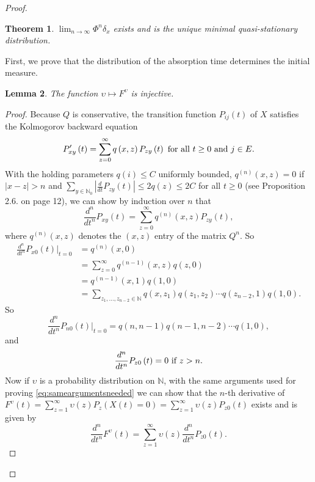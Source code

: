 \documentclass[12pt,a4paper]{scrartcl}
\newtheorem{theorem}{Theorem}[section]
\newtheorem{lemma}[theorem]{Lemma}
\numberwithin{equation}{section}
\newcommand{\N}{\mathbb{N}} %
\begin{document}
\begin{proof}
\begin{theorem} \label{th:birthanddeathmaintheorem}
$\lim_{n \to \infty} \Phi^n \delta_x$ exists and is the unique minimal quasi-stationary distribution.
\end{theorem}  

First, we prove that the distribution of the absorption time determines the initial measure.

\begin{lemma}
The function $\upsilon \mapsto F^{\upsilon}$ is injective.
\end{lemma}

\begin{proof}
Because $Q$ is conservative, the transition function $P_{ij}\left(t\right)$ of $X$ satisfies the Kolmogorov backward equation $$P_{xy}'\left(t\right) = \sum_{z = 0}^{\infty} q\left(x,z\right) P_{zy}\left(t\right) \textnormal{ for all } t\geq0 \textnormal{ and } j\in E. $$ 
With the holding parameters $q\left(i\right) \leq C$ uniformly bounded, $q^{\left(n\right)}\left(x,z\right) = 0$ if $\left|x - z\right| > n$ and $ \sum_{y \in \N_0} \left|\frac{d}{dt} P_{zy}\left(t\right) \right| \leq  2 q\left(z\right) \leq 2 C$ for all $t \geq 0$ (see \cite{anderson} Proposition 2.6. on page 12), we can show by induction over $n$ that
\begin{equation} \label{eq:sameargumentsneeded}
\frac{d^n}{dt^n} P_{xy}\left(t\right) = \sum_{z=0}^{\infty} q^{\left(n\right)}\left(x,z\right) P_{zy}\left(t\right),
\end{equation}
where $q^{\left(n\right)}\left(x,z\right)$ denotes the $\left(x,z\right)$ entry of the matrix $Q^n.$ So
\begin{align*}
\frac{d^n}{dt^n} P_{x0}\left(t\right) |_{t=0} &=q^{\left(n\right)}\left(x,0\right)\\
&= \sum_{z=0}^{\infty} q^{\left(n-1\right)}\left(x,z\right) q\left(z,0\right) \\
&= q^{\left(n-1\right)}\left(x,1\right) q\left(1,0\right)\\
&= \sum_{z_1,\ldots, z_{n-2} \in \N} q\left(x,z_1\right)q\left(z_1,z_2\right)\cdots q\left(z_{n-2},1\right) q\left(1,0\right).
\end{align*}
So
$$ \frac{d^n}{dt^n} P_{n0}\left(t\right) |_{t=0} = q\left(n,n-1\right) q\left(n-1,n-2\right) \cdots q\left(1,0\right), $$
and
$$\frac{d^n}{dt^n} P_{z0}\left(t\right) = 0 \textnormal{ if } z > n.$$
Now if $\upsilon$ is a probability distribution on $\N$, with the same arguments used for proving \eqref{eq:sameargumentsneeded} we can show that the $n$-th derivative of $F^{\upsilon}\left(t\right) = \sum_{z=1}^{\infty} \upsilon\left(z\right) P_z\left(X\left(t\right) = 0 \right) = \sum_{z=1}^{\infty} \upsilon\left(z\right) P_{z0}\left(t\right)$ exists and is given by
\begin{equation} \label{eq:evaluatedattzero}
\frac{d^n}{dt^n}F^{\upsilon}\left(t\right) = \sum_{z=1}^{\infty} \upsilon\left(z\right) \frac{d^n}{dt^n} P_{z0}\left(t\right).
\end{equation}


\end{proof}
\end{proof}
\end{document}
